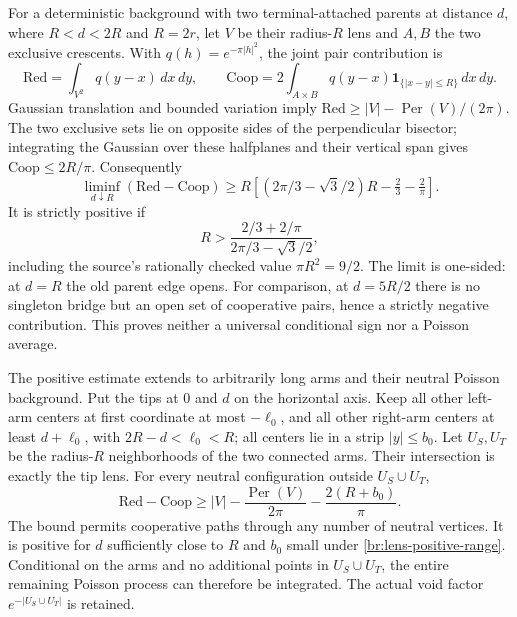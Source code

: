 \documentclass[11pt,a4paper]{article}
\theoremstyle{definition}
\theoremstyle{remark}
\numberwithin{equation}{section}
\begin{document}
For a deterministic background with two terminal-attached parents
at distance $d$, where $R<d<2R$ and $R=2r$, let $V$ be their
radius-$R$ lens and $A,B$ the two exclusive crescents. With
$q(h)=e^{-\pi|h|^2}$, the joint pair contribution is
\[
 \mathrm{Red}=\int_{V^2}q(y-x)\,dx\,dy,\qquad
 \mathrm{Coop}=2\int_{A\times B}q(y-x)
                        \mathbf1_{\{|x-y|\le R\}}\,dx\,dy.
\]
Gaussian translation and bounded variation imply
$\mathrm{Red}\ge|V|-\operatorname{Per}(V)/(2\pi)$.
The two exclusive sets lie on opposite sides of the perpendicular
bisector; integrating the Gaussian over these halfplanes and their
vertical span gives $\mathrm{Coop}\le2R/\pi$.
Consequently
\[
 \liminf_{d\downarrow R}(\mathrm{Red}-\mathrm{Coop})
 \ge R\left[(2\pi/3-\sqrt3/2)R-\tfrac23-\tfrac2\pi\right].
\]
It is strictly positive if
\begin{equation}\label{br:lens-positive-range}
 R>\frac{2/3+2/\pi}{2\pi/3-\sqrt3/2},
\end{equation}
including the source's rationally checked value $\pi R^2=9/2$.
The limit is one-sided: at $d=R$ the old parent edge opens.
For comparison, at $d=5R/2$ there is no singleton bridge but an
open set of cooperative pairs, hence a strictly negative contribution.
This proves neither a universal conditional sign nor a Poisson average.

The positive estimate extends to arbitrarily long arms and their
neutral Poisson background. Put the tips at $0$ and $d$ on the
horizontal axis. Keep all other left-arm centers at first coordinate
at most $-\ell_0$, and all other right-arm centers at least
$d+\ell_0$, with $2R-d<\ell_0<R$; all centers lie in a strip
$|y|\le b_0$. Let $U_S,U_T$ be the radius-$R$ neighborhoods of
the two connected arms. Their intersection is exactly the tip lens.
For every neutral configuration outside $U_S\cup U_T$,
\begin{equation}\label{br:neutral-long-arms}
 \mathrm{Red}-\mathrm{Coop}
 \ge |V|-\frac{\operatorname{Per}(V)}{2\pi}
                         -\frac{2(R+b_0)}{\pi}.
\end{equation}
The bound permits cooperative paths through any number of neutral
vertices. It is positive for $d$ sufficiently close to $R$ and
$b_0$ small under \eqref{br:lens-positive-range}.
Conditional on the arms and no additional points in $U_S\cup U_T$,
the entire remaining Poisson process can therefore be integrated.
The actual void factor $e^{-|U_S\cup U_T|}$ is retained.
\end{document}
